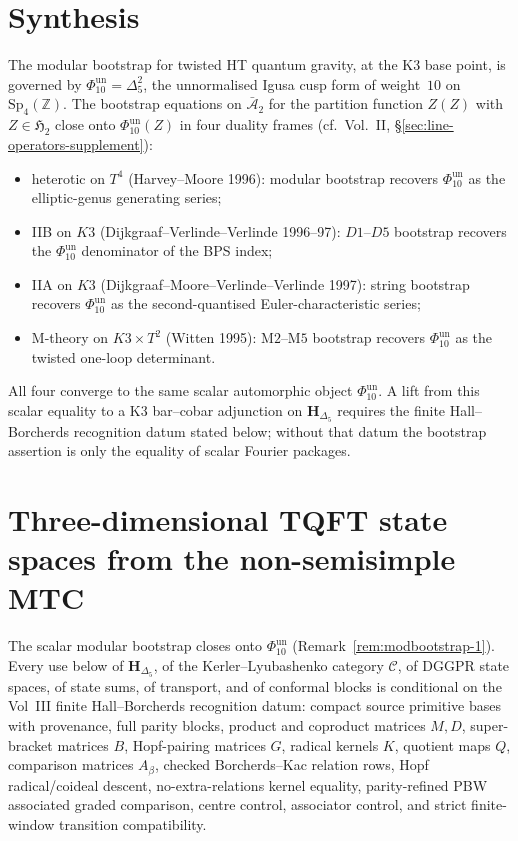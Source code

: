 \section{Synthesis}
\label{sec:modbootstrap-supplement}

\begin{remark}
\label{rem:modbootstrap-1}
The modular bootstrap for twisted HT quantum gravity, at the K3 base
point, is governed by
$\Phi_{10}^{\mathrm{un}}=\Delta_5^2$, the unnormalised Igusa cusp
form of weight~$10$ on $\mathrm{Sp}_4(\mathbb Z)$. The bootstrap equations
on $\bar{\mathcal A}_2$ for the partition function $Z(Z)$ with $Z\in\mathfrak H_2$
close onto $\Phi_{10}^{\mathrm{un}}(Z)$ in four duality frames (cf.~Vol.~II,
\S\ref{sec:line-operators-supplement}):
\begin{itemize}
\item heterotic on $T^4$ \textrm{(Harvey--Moore 1996)}: modular bootstrap recovers $\Phi_{10}^{\mathrm{un}}$
 as the elliptic-genus generating series;
\item IIB on $K3$ \textrm{(Dijkgraaf--Verlinde--Verlinde 1996--97)}: $D1$--$D5$ bootstrap
 recovers the $\Phi_{10}^{\mathrm{un}}$ denominator of the BPS index;
\item IIA on $K3$ \textrm{(Dijkgraaf--Moore--Verlinde--Verlinde 1997)}: string bootstrap
 recovers $\Phi_{10}^{\mathrm{un}}$ as the second-quantised Euler-characteristic series;
\item M-theory on $K3\times T^2$ \textrm{(Witten 1995)}: M$2$--M$5$ bootstrap
 recovers $\Phi_{10}^{\mathrm{un}}$ as the twisted one-loop determinant.
\end{itemize}
All four converge to the same scalar automorphic object
$\Phi_{10}^{\mathrm{un}}$.  A lift from this scalar equality to a K3
bar--cobar adjunction on $\mathbf H_{\Delta_5}$ requires the finite
Hall--Borcherds recognition datum stated below; without that datum the
bootstrap assertion is only the equality of scalar Fourier packages.
\end{remark}

\section{Three-dimensional TQFT state spaces from the non-semisimple MTC}
\label{sec:modbootstrap-3d-tqft}

The scalar modular bootstrap closes onto $\Phi_{10}^{\mathrm{un}}$
(Remark~\ref{rem:modbootstrap-1}).  Every use below of
$\mathbf H_{\Delta_5}$, of the Kerler--Lyubashenko category
$\mathcal C$, of DGGPR state spaces, of state sums, of transport, and
of conformal blocks is conditional on the Vol~III finite
Hall--Borcherds recognition datum: compact source primitive bases with
provenance, full parity blocks, product and coproduct matrices $M,D$,
super-bracket matrices $B$, Hopf-pairing matrices $G$, radical kernels
$K$, quotient maps $Q$, comparison matrices $A_\beta$, checked
Borcherds--Kac relation rows, Hopf radical/coideal descent,
no-extra-relations kernel equality, parity-refined PBW associated
graded comparison, centre control, associator control, and strict
finite-window transition compatibility.

